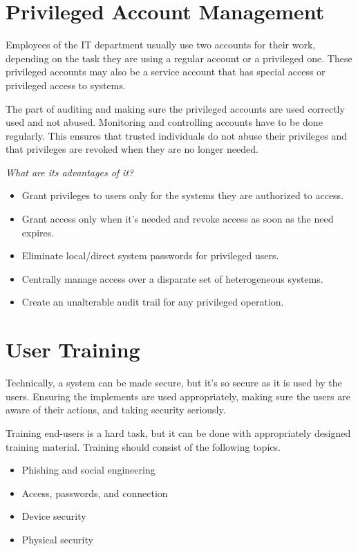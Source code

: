 \section{Privileged Account Management} 
Employees of the IT department usually use two accounts for their work, depending on the task they are using a regular account or a privileged one.
These privileged accounts may also be a service account that has special access or privileged access to systems.

The part of auditing and making sure the privileged accounts are used correctly used and not abused.
Monitoring and controlling accounts have to be done regularly.
This ensures that trusted individuals do not abuse their privileges and that privileges are revoked when they are no longer needed.

\textit{What are its advantages of it?}
\begin{itemize}
    \item Grant privileges to users only for the systems they are authorized to access.
    \item Grant access only when it's needed and revoke access as soon as the need expires.
    \item Eliminate local/direct system passwords for privileged users.
    \item Centrally manage access over a disparate set of heterogeneous systems.
    \item Create an unalterable audit trail for any privileged operation.
\end{itemize}

\section{User Training}
Technically, a system can be made secure, but it's so secure as it is used by the users.
Ensuring the implements are used appropriately, making sure the users are aware of their actions, and taking security seriously.

Training end-users is a hard task, but it can be done with appropriately designed training material.
Training should consist of the following topics.
\begin{itemize}
    \item Phishing and social engineering
    \item Access, passwords, and connection
    \item Device security
    \item Physical security
\end{itemize}


